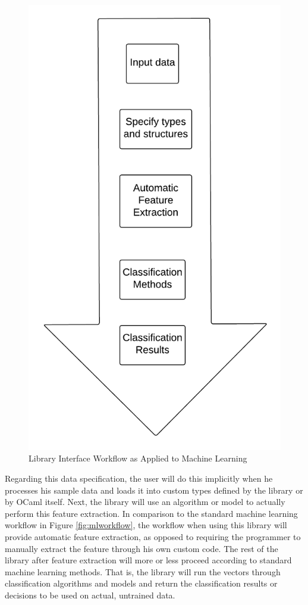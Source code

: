 \documentclass{sig-alternate}
\begin{document}
\begin{figure}[h]
	\begin{center}
		\includegraphics[width=0.70\linewidth]{ourworkflow}
	\end{center}
	\vspace{-12pt}
	\caption{Library Interface Workflow as Applied to Machine Learning}
	\label{fig:ourworkflow}
\end{figure}

\vspace{10pt}

Regarding this data specification, the user will do this implicitly when he processes 
his sample data and loads it into custom types defined by the library or by OCaml itself. 
Next, the library will use an algorithm or model to actually perform this feature extraction. In 
comparison to the standard machine learning workflow in Figure \ref{fig:mlworkflow}, the workflow 
when using this library will provide automatic feature extraction, as opposed to requiring the 
programmer to manually extract the feature through his own custom code.  The rest of the library 
after feature extraction will more or less proceed according to standard machine learning methods.
That is, the library will run the vectors through classification algorithms and models 
and return the classification results or decisions to be used on actual, untrained data.
\end{document}

